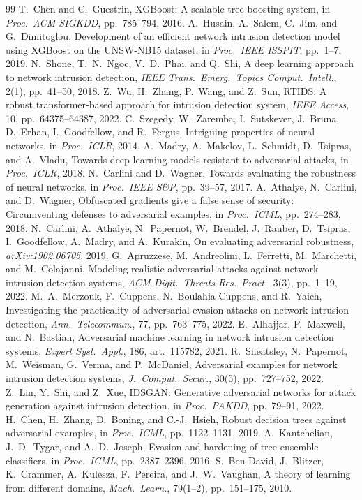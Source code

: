 \documentclass[11pt,a4paper]{article}
\begin{document}
\begin{thebibliography}{99}
 T.~Chen and C.~Guestrin, XGBoost: A scalable tree boosting system, in \emph{Proc.\ ACM SIGKDD}, pp.~785--794, 2016.
 A.~Husain, A.~Salem, C.~Jim, and G.~Dimitoglou, Development of an efficient network intrusion detection model using XGBoost on the UNSW-NB15 dataset, in \emph{Proc.\ IEEE ISSPIT}, pp.~1--7, 2019.
 N.~Shone, T.~N.~Ngoc, V.~D.~Phai, and Q.~Shi, A deep learning approach to network intrusion detection, \emph{IEEE Trans.\ Emerg.\ Topics Comput.\ Intell.}, 2(1), pp.~41--50, 2018.
 Z.~Wu, H.~Zhang, P.~Wang, and Z.~Sun, RTIDS: A robust transformer-based approach for intrusion detection system, \emph{IEEE Access}, 10, pp.~64375--64387, 2022.
 C.~Szegedy, W.~Zaremba, I.~Sutskever, J.~Bruna, D.~Erhan, I.~Goodfellow, and R.~Fergus, Intriguing properties of neural networks, in \emph{Proc.\ ICLR}, 2014.
 A.~Madry, A.~Makelov, L.~Schmidt, D.~Tsipras, and A.~Vladu, Towards deep learning models resistant to adversarial attacks, in \emph{Proc.\ ICLR}, 2018.
 N.~Carlini and D.~Wagner, Towards evaluating the robustness of neural networks, in \emph{Proc.\ IEEE S\&P}, pp.~39--57, 2017.
 A.~Athalye, N.~Carlini, and D.~Wagner, Obfuscated gradients give a false sense of security: Circumventing defenses to adversarial examples, in \emph{Proc.\ ICML}, pp.~274--283, 2018.
 N.~Carlini, A.~Athalye, N.~Papernot, W.~Brendel, J.~Rauber, D.~Tsipras, I.~Goodfellow, A.~Madry, and A.~Kurakin, On evaluating adversarial robustness, \emph{arXiv:1902.06705}, 2019.
 G.~Apruzzese, M.~Andreolini, L.~Ferretti, M.~Marchetti, and M.~Colajanni, Modeling realistic adversarial attacks against network intrusion detection systems, \emph{ACM Digit.\ Threats Res.\ Pract.}, 3(3), pp.~1--19, 2022.
 M.~A.~Merzouk, F.~Cuppens, N.~Boulahia-Cuppens, and R.~Yaich, Investigating the practicality of adversarial evasion attacks on network intrusion detection, \emph{Ann.\ Telecommun.}, 77, pp.~763--775, 2022.
 E.~Alhajjar, P.~Maxwell, and N.~Bastian, Adversarial machine learning in network intrusion detection systems, \emph{Expert Syst.\ Appl.}, 186, art.~115782, 2021.
 R.~Sheatsley, N.~Papernot, M.~Weisman, G.~Verma, and P.~McDaniel, Adversarial examples for network intrusion detection systems, \emph{J.\ Comput.\ Secur.}, 30(5), pp.~727--752, 2022.
 Z.~Lin, Y.~Shi, and Z.~Xue, IDSGAN: Generative adversarial networks for attack generation against intrusion detection, in \emph{Proc.\ PAKDD}, pp.~79--91, 2022.
 H.~Chen, H.~Zhang, D.~Boning, and C.-J.~Hsieh, Robust decision trees against adversarial examples, in \emph{Proc.\ ICML}, pp.~1122--1131, 2019.
 A.~Kantchelian, J.~D.~Tygar, and A.~D.~Joseph, Evasion and hardening of tree ensemble classifiers, in \emph{Proc.\ ICML}, pp.~2387--2396, 2016.
 S.~Ben-David, J.~Blitzer, K.~Crammer, A.~Kulesza, F.~Pereira, and J.~W.~Vaughan, A theory of learning from different domains, \emph{Mach.\ Learn.}, 79(1--2), pp.~151--175, 2010.
\end{thebibliography}
\end{document}
